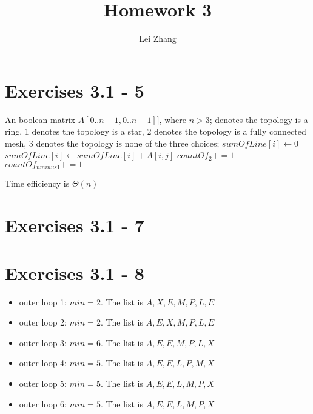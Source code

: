 \documentclass{article}
\title{Homework 3}
\author{Lei Zhang}
\begin{document}
\maketitle

\section{Exercises 3.1 - 5}

\begin{center}
\begin{algorithmic}
\INPUT
An boolean matrix $A[0..n-1,0..n-1]]$, where $n > 3$;
 denotes the topology is a ring,
1 denotes the topology is a star,
2 denotes the topology is a fully connected mesh,
3 denotes the topology is none of the three choices;
\State $sumOfLine[i] \leftarrow 0$
\EndFor
{}
\State $sumOfLine[i] \leftarrow sumOfLine[i] + A[i,j]$
\EndFor
\EndFor
{}
\State $countOf_2 += 1$
\EndIf
\EndFor
{}
\State $countOf_{nminus1} += 1$
\EndIf
\EndFor
{}
\State {}
\EndIf
{}
\State {}
\EndIf
{}
\State {}
\EndIf
\State {}
\end{algorithmic}
\end{center}

Time efficiency is $\Theta(n)$

\section{Exercises 3.1 - 7}





\section{Exercises 3.1 - 8}

\begin{itemize}
\item outer loop 1: $min=2$. The list is $A,X,E,M,P,L,E$
\item outer loop 2: $min=2$. The list is $A,E,X,M,P,L,E$
\item outer loop 3: $min=6$. The list is $A,E,E,M,P,L,X$
\item outer loop 4: $min=5$. The list is $A,E,E,L,P,M,X$
\item outer loop 5: $min=5$. The list is $A,E,E,L,M,P,X$
\item outer loop 6: $min=5$. The list is $A,E,E,L,M,P,X$
\end{itemize}
\end{document}
